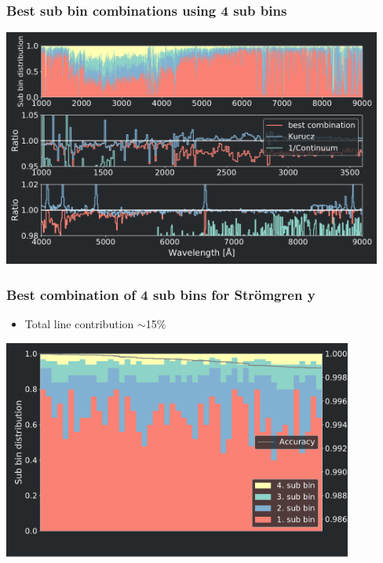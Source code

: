 \frame
{
	\frametitle{Best sub bin combinations using 4 sub bins}
	\includegraphics[width=125mm]{images/best_combination_finder_0}
}
\frame
{
	\frametitle{Best combination of 4 sub bins for Str\"omgren y}
	\begin{itemize}
		\item Total line contribution $\sim$15\%
	\end{itemize}
	\centering
	\includegraphics[width=115mm]{images/optimal_stroemgren_1_c_b}
}

